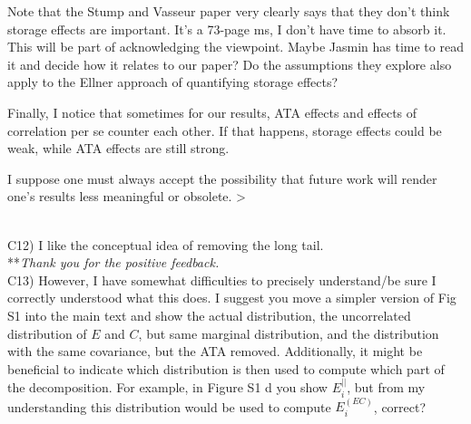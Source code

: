 \documentclass[letterpaper,11pt]{article}
\begin{document}
{Note that the Stump and Vasseur paper very clearly says that they don't think storage effects are important. 
It's a 73-page ms, I don't have time to absorb it. This will be part of acknowledging the viewpoint. Maybe Jasmin
has time to read it and decide how it relates to our paper? Do the assumptions they explore also apply
to the Ellner approach of quantifying storage effects?

Finally, I notice that sometimes for our results, ATA effects and effects of correlation per se counter
each other. If that happens, storage effects could be weak, while ATA effects are still strong. 

I suppose one must always accept the possibility that future work will render one's results less
meaningful or obsolete.
>} \\

\noindent C12) I like the conceptual idea of removing the long tail. \\

\noindent ***\emph{Thank you for the positive feedback.} \\

\noindent C13) However, I have somewhat difficulties to precisely understand/be sure I correctly understood what this does. I suggest you move a simpler version of Fig S1 into the main text and show the actual distribution, the uncorrelated distribution of $E$ and $C$, but same marginal distribution, and the distribution with the same covariance, but the ATA removed. Additionally, it might be beneficial to indicate which distribution is then used to compute which part of the decomposition. For example, in Figure S1 d you show $E_i^{||}$, but from my understanding this distribution would be used to compute $E_i^{(EC)}$, correct? \\
\end{document}
